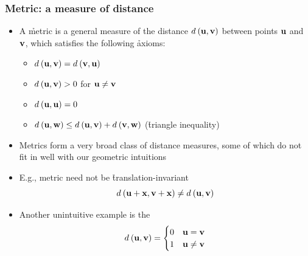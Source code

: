 \begin{frame}
  \frametitle{Metric: a measure of distance}

  \begin{itemize}
  \item A \h{metric} is a general measure of the distance $\dist{\vu}{\vv}$
    between points $\vu$ and $\vv$, which satisfies the following \h{axioms}:
    \begin{itemize}
      \item $\dist{\vu}{\vv} = \dist{\vv}{\vu}$
      \item $\dist{\vu}{\vv} > 0$ for $\vu \neq \vv$
      \item $\dist{\vu}{\vu} = 0$
      \item $\dist{\vu}{\vw} \leq \dist{\vu}{\vv} + \dist{\vv}{\vw}$
        (\h{triangle inequality})
    \end{itemize}
    \pause
  \item Metrics form a very broad class of distance measures, some of which do
    not fit in well with our geometric intuitions%
    \pause
  \item E.g., metric need not be \h{translation-invariant}
    \[ \dist{\vu+\vx}{\vv+\vx} \neq \dist{\vu}{\vv} \]
    \pause\ungap
  \item Another unintuitive example is the 
    \[
    \dist{\vu}{\vv} =
    \begin{cases}
      0 & \vu = \vv \\
      1 & \vu \neq \vv
    \end{cases}
    \]
  \end{itemize}
\end{frame}

